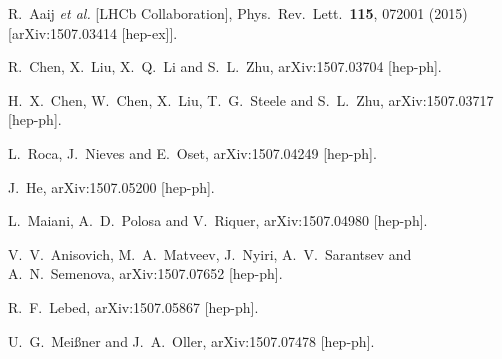 \documentclass[a4paper,10pt]{article}
\begin{document}
\begin{thebibliography}{9}
  R.~Aaij {\it et al.} [LHCb Collaboration],
  Phys.\ Rev.\ Lett.\  {\bf 115}, 072001 (2015)
  [arXiv:1507.03414 [hep-ex]].

  R.~Chen, X.~Liu, X.~Q.~Li and S.~L.~Zhu,
  arXiv:1507.03704 [hep-ph].

  H.~X.~Chen, W.~Chen, X.~Liu, T.~G.~Steele and S.~L.~Zhu,
  arXiv:1507.03717 [hep-ph].

  L.~Roca, J.~Nieves and E.~Oset,
  arXiv:1507.04249 [hep-ph].


  J.~He,
  arXiv:1507.05200 [hep-ph].


  L.~Maiani, A.~D.~Polosa and V.~Riquer,
  arXiv:1507.04980 [hep-ph].


  V.~V.~Anisovich, M.~A.~Matveev, J.~Nyiri, A.~V.~Sarantsev and A.~N.~Semenova,
  arXiv:1507.07652 [hep-ph].




  R.~F.~Lebed,
  arXiv:1507.05867 [hep-ph].

  U.~G.~Meißner and J.~A.~Oller,
  arXiv:1507.07478 [hep-ph].


\end{thebibliography}
\end{document}
